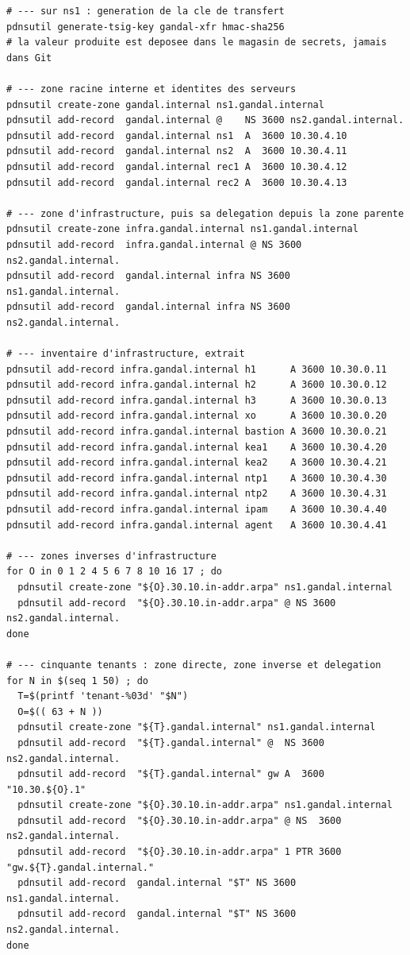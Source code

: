 \begin{lstlisting}[caption={Création de l'espace de nommage sur ns1},
  label=lst:zones]
# --- sur ns1 : generation de la cle de transfert
pdnsutil generate-tsig-key gandal-xfr hmac-sha256
# la valeur produite est deposee dans le magasin de secrets, jamais dans Git

# --- zone racine interne et identites des serveurs
pdnsutil create-zone gandal.internal ns1.gandal.internal
pdnsutil add-record  gandal.internal @    NS 3600 ns2.gandal.internal.
pdnsutil add-record  gandal.internal ns1  A  3600 10.30.4.10
pdnsutil add-record  gandal.internal ns2  A  3600 10.30.4.11
pdnsutil add-record  gandal.internal rec1 A  3600 10.30.4.12
pdnsutil add-record  gandal.internal rec2 A  3600 10.30.4.13

# --- zone d'infrastructure, puis sa delegation depuis la zone parente
pdnsutil create-zone infra.gandal.internal ns1.gandal.internal
pdnsutil add-record  infra.gandal.internal @ NS 3600 ns2.gandal.internal.
pdnsutil add-record  gandal.internal infra NS 3600 ns1.gandal.internal.
pdnsutil add-record  gandal.internal infra NS 3600 ns2.gandal.internal.

# --- inventaire d'infrastructure, extrait
pdnsutil add-record infra.gandal.internal h1      A 3600 10.30.0.11
pdnsutil add-record infra.gandal.internal h2      A 3600 10.30.0.12
pdnsutil add-record infra.gandal.internal h3      A 3600 10.30.0.13
pdnsutil add-record infra.gandal.internal xo      A 3600 10.30.0.20
pdnsutil add-record infra.gandal.internal bastion A 3600 10.30.0.21
pdnsutil add-record infra.gandal.internal kea1    A 3600 10.30.4.20
pdnsutil add-record infra.gandal.internal kea2    A 3600 10.30.4.21
pdnsutil add-record infra.gandal.internal ntp1    A 3600 10.30.4.30
pdnsutil add-record infra.gandal.internal ntp2    A 3600 10.30.4.31
pdnsutil add-record infra.gandal.internal ipam    A 3600 10.30.4.40
pdnsutil add-record infra.gandal.internal agent   A 3600 10.30.4.41

# --- zones inverses d'infrastructure
for O in 0 1 2 4 5 6 7 8 10 16 17 ; do
  pdnsutil create-zone "${O}.30.10.in-addr.arpa" ns1.gandal.internal
  pdnsutil add-record  "${O}.30.10.in-addr.arpa" @ NS 3600 ns2.gandal.internal.
done

# --- cinquante tenants : zone directe, zone inverse et delegation
for N in $(seq 1 50) ; do
  T=$(printf 'tenant-%03d' "$N")
  O=$(( 63 + N ))
  pdnsutil create-zone "${T}.gandal.internal" ns1.gandal.internal
  pdnsutil add-record  "${T}.gandal.internal" @  NS 3600 ns2.gandal.internal.
  pdnsutil add-record  "${T}.gandal.internal" gw A  3600 "10.30.${O}.1"
  pdnsutil create-zone "${O}.30.10.in-addr.arpa" ns1.gandal.internal
  pdnsutil add-record  "${O}.30.10.in-addr.arpa" @ NS  3600 ns2.gandal.internal.
  pdnsutil add-record  "${O}.30.10.in-addr.arpa" 1 PTR 3600 "gw.${T}.gandal.internal."
  pdnsutil add-record  gandal.internal "$T" NS 3600 ns1.gandal.internal.
  pdnsutil add-record  gandal.internal "$T" NS 3600 ns2.gandal.internal.
done


\end{lstlisting}
